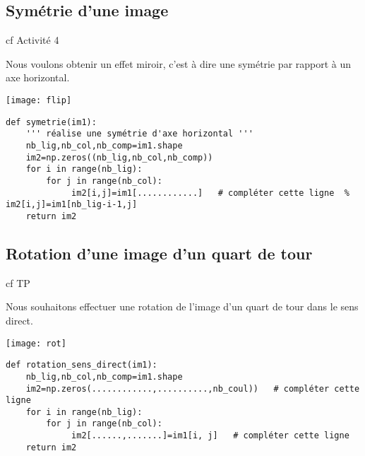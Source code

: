 \subsection{Symétrie d'une image}
cf Activité 4 \\ 
\begin{minipage}{5cm}
 Nous voulons obtenir un effet miroir, c'est à dire
une symétrie par rapport à un axe horizontal.
\begin{center}
{\texttt{[image: flip]}}
\end{center}
\end{minipage}
\hspace{1cm}
\begin{minipage}{10cm}
 \begin{lstlisting}
def symetrie(im1):
    ''' réalise une symétrie d'axe horizontal '''
    nb_lig,nb_col,nb_comp=im1.shape
    im2=np.zeros((nb_lig,nb_col,nb_comp))
    for i in range(nb_lig):
        for j in range(nb_col):
             im2[i,j]=im1[............]   # compléter cette ligne  % im2[i,j]=im1[nb_lig-i-1,j]   
    return im2
\end{lstlisting}
\end{minipage}



\subsection{Rotation d'une image d'un quart de tour}


cf TP\\ 
\begin{minipage}{5cm}
Nous souhaitons effectuer une rotation de l'image d'un quart de tour dans le sens direct.
\begin{center}
{\texttt{[image: rot]}}
\end{center}
\end{minipage}
\hspace{1cm}
\begin{minipage}{10cm}
 \begin{lstlisting}
def rotation_sens_direct(im1):
    nb_lig,nb_col,nb_comp=im1.shape
    im2=np.zeros(............,..........,nb_coul))   # compléter cette ligne
    for i in range(nb_lig):
        for j in range(nb_col):
             im2[......,.......]=im1[i, j]   # compléter cette ligne
    return im2
\end{lstlisting}
\end{minipage}


